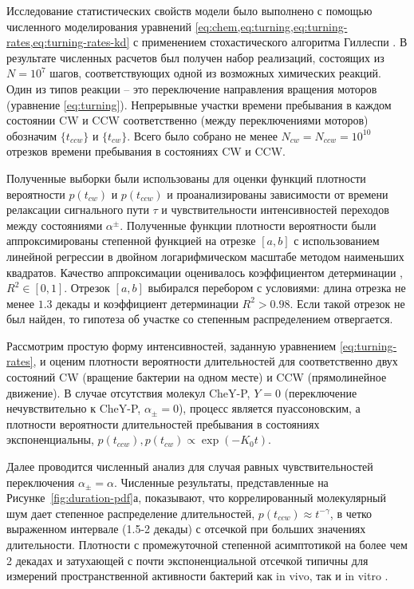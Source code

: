 Исследование статистических свойств модели было выполнено с помощью численного моделирования уравнений \cref{eq:chem,eq:turning,eq:turning-rates,eq:turning-rates-kd} с применением стохастического алгоритма Гиллеспи \cite{gillespie_stochastic_2007}. В результате численных расчетов был получен набор реализаций, состоящих из $N=10^7$ шагов, соответствующих одной из возможных химических реакций. Один из типов реакции -- это переключение направления вращения моторов (уравнение \cref{eq:turning}). Непрерывные участки времени пребывания в каждом состоянии CW и CCW соответственно (между переключениями моторов) обозначим $\{t_{ccw}\}$ и $\{t_{cw}\}$. Всего было собрано не менее $N_{cw} = N_{ccw} = 10^{10}$ отрезков времени пребывания в состояниях CW и CCW.

Полученные выборки были использованы для оценки функций плотности вероятности $p(t_{cw})$ и $p(t_{ccw})$ и проанализированы зависимости от времени релаксации сигнального пути $\tau$ и чувствительности интенсивностей переходов между состояниями $\alpha^{\pm}$. Полученные функции плотности вероятности были аппроксимированы степенной функцией на отрезке $[a, b]$ с использованием линейной регрессии в двойном логарифмическом масштабе методом наименьших квадратов. Качество аппроксимации оценивалось коэффициентом детерминации \cite{magnus_2021}, $R^2 \in [0, 1]$. Отрезок $[a, b]$ выбирался перебором с условиями: длина отрезка не менее $1.3$ декады и коэффициент детерминации $R^2 > 0.98$. Если такой отрезок не был найден, то гипотеза об участке со степенным распределением отвергается. 

Рассмотрим простую форму интенсивностей, заданную уравнением \cref{eq:turning-rates}, и оценим плотности вероятности длительностей для соответственно двух состояний CW (вращение бактерии на одном месте) и CCW (прямолинейное движение). В случае отсутствия молекул CheY-P, $Y=0$ (переключение нечувствительно к CheY-P, $\alpha_{\pm}=0$), процесс является пуассоновским, а плотности вероятности длительностей пребывания в состояниях экспоненциальны, $p(t_{ccw}), p(t_{cw}) \propto \exp(-K_0 t)$.

Далее проводится численный анализ для случая равных чувствительностей переключения $\alpha_\pm = \alpha$. Численные результаты, представленные на Рисунке~\cref{fig:duration-pdf}а, показывают, что коррелированный молекулярный шум дает степенное распределение длительностей, $p(t_{ccw}) \approx t^{-\gamma}$, в четко выраженном интервале (1.5-2 декады) с отсечкой при больших значениях длительности. Плотности с промежуточной степенной асимптотикой на более чем 2 декадах и затухающей с почти экспоненциальной отсечкой типичны для измерений пространственной активности бактерий как in vivo, так и in vitro \cite{korobkova_molecular_2004,harris_generalized_2012}.


